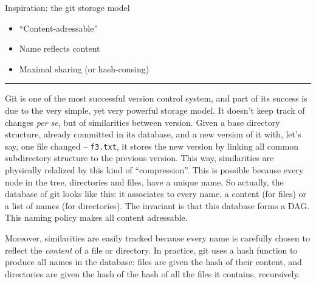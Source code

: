 \documentclass[ignorenonframetext,red]{beamer}
\begin{document}
\begin{frame}{Inspiration: the \textsf{git} storage model}
\begin{center}
\begin{overlayarea}{\textwidth}{12em}
    \end{overlayarea}
  \end{center}%
  \begin{itemize}\small %
  \item<7-> ``Content-adressable''%
  \item<8-> Name reflects content%
  \item<9-> Maximal sharing (or hash-consing)%
  \end{itemize}%
\end{frame}
\hrule

\textsf{Git} is one of the most successful version control system, and
part of its success is due to the very simple, yet very powerful
storage model. It doesn't keep track of changes \emph{per se}, but of
similarities between version. Given a base directory structure,
already committed in its database, and a new version of it with, let's
say, one file changed -- \texttt{f3.txt}, it stores the new version by
linking all common subdirectory structure to the previous
version. This way, similarities are physically relalized by this kind
of ``compression''. This is possible because every node in the tree,
directories and files, have a unique name. So actually, the database
of \textsf{git} looks like this: it associates to every name, a
content (for files) or a list of names (for directories). The
invariant is that this database forms a DAG. This naming policy makes
all content adressable.

Moreover, similarities are easily tracked because every name is
carefully chosen to reflect the \emph{content} of a file or directory.
In practice, \textsf{git} uses a hash function to produce all names in
the database: files are given the hash of their content, and
directories are given the hash of the hash of all the files it
contains, recursively.
\end{document}
